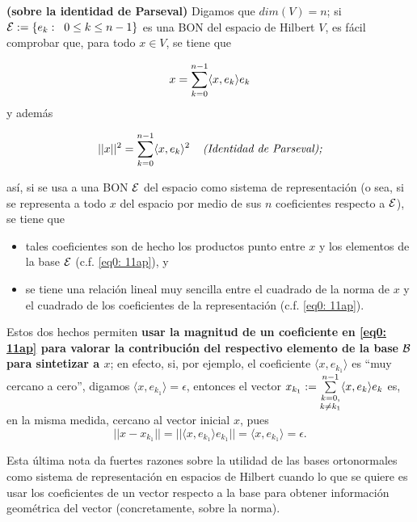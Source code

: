 \begin{nota}
\label{nota: sobre la identidad de parseval}
\textbf{(sobre la identidad de Parseval)}
Digamos que $dim(V)=n$; si 
$\mathcal{E} := \{e_{k}: \hspace{0.2cm} 0 \leq k \leq n-1 \}$ es una
BON del espacio de Hilbert $V$, es fácil comprobar que, para todo
$x \in V$, se tiene que 

\begin{equation}
\label{eq0: 11ap}
x = \sum\limits_{k=0}^{n-1}\langle x , e_{k} \rangle e_{k}
\end{equation}
y además

\begin{equation}
\label{eq1: 11ap}
|| x ||^{2} = \sum\limits_{k=0}^{n-1}\langle x , e_{k} \rangle^{2}
\hspace{0.4cm} \textit{(Identidad de Parseval);}
\end{equation}


\noindent
así, si se usa a una BON $\mathcal{E}$ del espacio como sistema
de representación (o sea, si se representa a todo $x$ del espacio 
por medio de sus $n$ coeficientes respecto a $\mathcal{E}$), se tiene que
\begin{itemize}
	\item tales coeficientes son de hecho los productos punto entre
	$x$ y los elementos de la base $\mathcal{E}$ (c.f. 
	\eqref{eq0: 11ap}), y
	\item se tiene una relación lineal muy sencilla entre el cuadrado
	de la norma de $x$ y el cuadrado de los coeficientes de la representación
	(c.f. \eqref{eq0: 11ap}).
\end{itemize}

Estos dos hechos permiten \textbf{usar la magnitud de un coeficiente en 
\eqref{eq0: 11ap} para valorar la contribución del respectivo 
elemento de la base $\mathcal{B}$ para sintetizar a $x$};
en efecto, si, por ejemplo, el coeficiente $\langle x, e_{k_{1}} \rangle$
es ``muy cercano a cero'', digamos $\langle x, e_{k_{1}} \rangle = \epsilon$,  
entonces el vector 
$x_{k_{1}}:= \sum\limits_{\substack{ {k=0}, \\  {k \neq k_{1}} }}^{n-1}
\langle x , e_{k} \rangle e_{k}$
es, en la misma medida, cercano al vector inicial $x$, pues
\[
|| x - x_{k_{1}} || = || \langle x , e_{k_{1}} \rangle e_{k_{1}} ||
= \langle x , e_{k_{1}} \rangle = \epsilon.
\]
\end{nota}

Esta última nota da fuertes razones sobre la utilidad
de las bases ortonormales como sistema de representación
en espacios de Hilbert cuando lo que se quiere es
usar los coeficientes de un vector respecto a la base
para obtener información geométrica del vector
(concretamente, sobre la norma).



